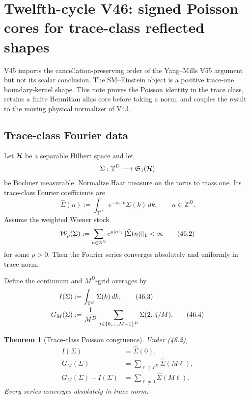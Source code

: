 \documentclass[11pt]{article}
\newtheorem{theorem}{Theorem}[section]
\theoremstyle{remark}
\begin{document}
\section{Twelfth-cycle V46: signed Poisson cores for trace-class
reflected shapes}
\label{sec:v12v46}

V45 imports the cancellation-preserving order of the Yang--Mills
V55 argument but not its scalar conclusion.  The SM--Einstein object
is a positive trace-one boundary-kernel shape.  This note proves the
Poisson identity in the trace class, retains a finite Hermitian alias
core before taking a norm, and couples the result to the moving
physical normalizer of V43.

\subsection{Trace-class Fourier data}

Let \({\cal H}\) be a separable Hilbert space and let
\[
 \Sigma:{\mathbb T}^D\longrightarrow{\mathfrak S}_1({\cal H})
\]
be Bochner measurable.  Normalize Haar measure on the torus to mass
one.  Its trace-class Fourier coefficients are
\begin{equation}
 \widehat\Sigma(n)
 :=
 \int_{{\mathbb T}^D}
 e^{-in\cdot k}\Sigma(k)\,dk,
 \qquad n\in\mathbb Z^D.                          \tag{46.1}
\end{equation}
Assume the weighted Wiener stock
\begin{equation}
 {\cal W}_\rho(\Sigma)
 :=
 \sum_{n\in\mathbb Z^D}
 e^{\rho|n|_1}\|\widehat\Sigma(n)\|_1
 <\infty                                         \tag{46.2}
\end{equation}
for some \(\rho>0\).  Then the Fourier series converges absolutely
and uniformly in trace norm.

Define the continuum and \(M^D\)-grid averages by
\begin{align}
 I(\Sigma)&:=\int_{{\mathbb T}^D}\Sigma(k)\,dk,    \tag{46.3}\\
 G_M(\Sigma)&:=
 {1\over M^D}
 \sum_{j\in\{0,\ldots,M-1\}^D}
 \Sigma(2\pi j/M).                               \tag{46.4}
\end{align}

\begin{theorem}[Trace-class Poisson congruence]
\label{thm:v12v46-Poisson}
Under (46.2),
\begin{align}
 I(\Sigma)&=\widehat\Sigma(0),                   \tag{46.5}\\
 G_M(\Sigma)&=
 \sum_{\ell\in\mathbb Z^D}\widehat\Sigma(M\ell), \tag{46.6}\\
 G_M(\Sigma)-I(\Sigma)&=
 \sum_{\ell\ne0}\widehat\Sigma(M\ell).           \tag{46.7}
\end{align}
Every series converges absolutely in trace norm.
\end{theorem}
\end{document}
